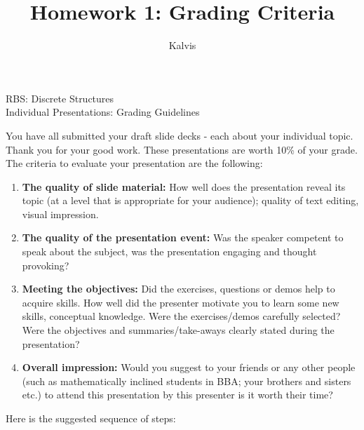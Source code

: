 \documentclass[jou]{apa6}
\title{Homework 1: Grading Criteria}
\author{Kalvis}
\affiliation{RBS}
\begin{document}
\thispagestyle{empty}

\twocolumn

\begin{center}
{\Large RBS: Discrete Structures}\\
{\Large Individual Presentations: Grading Guidelines}
\end{center}

You have all submitted your draft slide decks - each about your individual topic. Thank you for your good work. 
These presentations are worth 10\% of your grade. The criteria to evaluate your presentation are the following: 

\begin{enumerate}[(1)]
\item {\bf The quality of slide material:} How well does the presentation reveal its topic 
(at a level that is appropriate for your audience); quality of text editing, visual impression. 
\item {\bf The quality of the presentation event:} Was the speaker competent to speak about the subject, 
was the presentation engaging and thought provoking?
\item {\bf Meeting the objectives:} Did the exercises, questions or demos help to acquire skills.
How well did the presenter motivate you to learn some new skills, conceptual knowledge. 
Were the exercises/demos carefully selected? Were the objectives and 
summaries/take-aways clearly stated during the presentation?
\item {\bf Overall impression:} Would you suggest to your friends or any other people 
(such as mathematically inclined students in BBA; your brothers and sisters etc.) 
to attend this presentation by this presenter \textendash{} is it worth their time?
\end{enumerate}


Here is the suggested sequence of steps:
\end{document}
